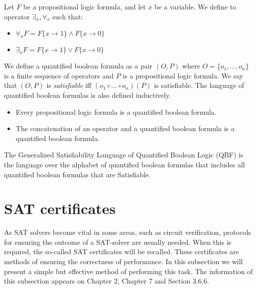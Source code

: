 \begin{definition}\label{def:QBF}
  Let $F$ be a propositional logic formula, and let $x$ be a variable. We define to operator $\exists_x, \forall_x$ such that:
  \begin{itemize}
  \item $\forall_x F = F\{x \to 1\} \land F\{x \to 0\}$
  \item $\exists_x F = F\{x \to 1\} \lor F\{x \to 0\}$
  \end{itemize}

  We define a quantified boolean formula as a pair $(O,P)$ where $O=\{o_1,...,o_n\}$ is a finite sequence of operators and $P$ is a propositional logic formula. We say that $(O,P)$ is \emph{satisfiable} iff $(o_1\circ ...\circ o_n) (P)$ is satisfiable. The language of quantified boolean formulas is also defined inductively.
  \begin{itemize}
  \item Every propositional logic formula is a quantified boolean formula.
  \item The concatenation of an operator and a quantified boolean formula is a quantified boolean formula.
  \end{itemize}
\end{definition}


\begin{definition}
  The Generalized Satisfiability Language of Quantified Boolean Logic (QBF) is the language over the alphabet of quantified boolean formulas that includes all quantified boolean formulas that are Satisfiable.
\end{definition}








\section{SAT certificates}

As SAT solvers become vital in some areas, such as circuit verification, protocols for ensuring the outcome of a SAT-solver are usually needed. When this is required, the so-called SAT certificates will be recalled. These certificates are methods of ensuring the correctness of performance. In this subsection we will present a simple but effective method of performing this task. The information of this subsection appears on Chapter 2\cite{schoning2013satisfiability}, Chapter 7\cite{marek2009introduction} and Section 3.6.6\cite{darwiche2009complete}.\\


